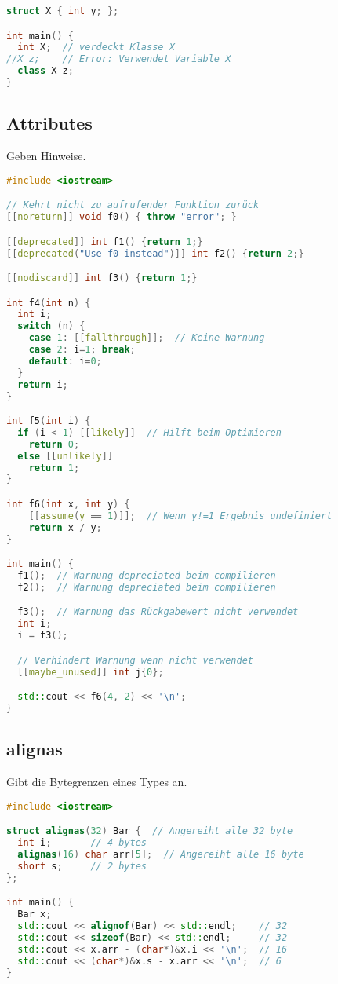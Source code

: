 \begin{lstlisting}[language=C++]
struct X { int y; };

int main() {
  int X;  // verdeckt Klasse X
//X z;    // Error: Verwendet Variable X
  class X z;
}
\end{lstlisting}

\subsection{Attributes}

Geben Hinweise.

\begin{lstlisting}[language=C++]
#include <iostream>

// Kehrt nicht zu aufrufender Funktion zurück
[[noreturn]] void f0() { throw "error"; }

[[deprecated]] int f1() {return 1;}
[[deprecated("Use f0 instead")]] int f2() {return 2;}

[[nodiscard]] int f3() {return 1;}

int f4(int n) {
  int i;
  switch (n) {
    case 1: [[fallthrough]];  // Keine Warnung
    case 2: i=1; break;
    default: i=0;
  }
  return i;
}

int f5(int i) {
  if (i < 1) [[likely]]  // Hilft beim Optimieren
    return 0;
  else [[unlikely]]
    return 1;
}

int f6(int x, int y) {
    [[assume(y == 1)]];  // Wenn y!=1 Ergebnis undefiniert
    return x / y;
}

int main() {
  f1();  // Warnung depreciated beim compilieren
  f2();  // Warnung depreciated beim compilieren

  f3();  // Warnung das Rückgabewert nicht verwendet
  int i;
  i = f3();

  // Verhindert Warnung wenn nicht verwendet
  [[maybe_unused]] int j{0};

  std::cout << f6(4, 2) << '\n';
}
\end{lstlisting}

\subsection{alignas}

Gibt die Bytegrenzen eines Types an.

\begin{lstlisting}[language=C++]
#include <iostream>

struct alignas(32) Bar {  // Angereiht alle 32 byte
  int i;       // 4 bytes
  alignas(16) char arr[5];  // Angereiht alle 16 byte
  short s;     // 2 bytes
};

int main() {
  Bar x;
  std::cout << alignof(Bar) << std::endl;    // 32
  std::cout << sizeof(Bar) << std::endl;     // 32
  std::cout << x.arr - (char*)&x.i << '\n';  // 16
  std::cout << (char*)&x.s - x.arr << '\n';  // 6
}
\end{lstlisting}

